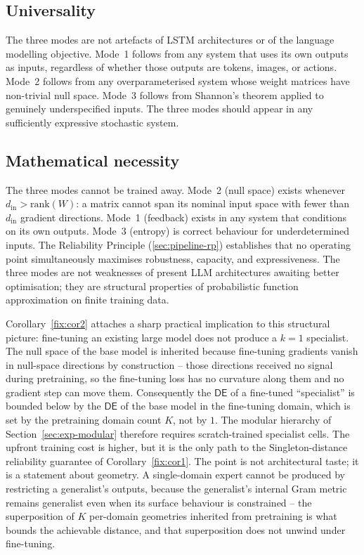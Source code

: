 \documentclass[11pt,a4paper]{article}
\newcommand{\DE}{\mathsf{DE}}
\begin{document}
\subsection{Universality}
\label{sec:disc-univ}

The three modes are not artefacts of LSTM architectures or of the language modelling objective. Mode~1 follows from any system that uses its own outputs as inputs, regardless of whether those outputs are tokens, images, or actions. Mode~2 follows from any overparameterised system whose weight matrices have non-trivial null space. Mode~3 follows from Shannon's theorem applied to genuinely underspecified inputs. The three modes should appear in any sufficiently expressive stochastic system.

\subsection{Mathematical necessity}
\label{sec:disc-necessity}
The three modes cannot be trained away. Mode~2 (null space) exists whenever $d_{\mathrm{in}} > \mathrm{rank}(W)$: a matrix cannot span its nominal input space with fewer than $d_{\mathrm{in}}$ gradient directions. Mode~1 (feedback) exists in any system that conditions on its own outputs. Mode~3 (entropy) is correct behaviour for underdetermined inputs. The Reliability Principle (\ref{sec:pipeline-rp}) establishes that no operating point simultaneously maximises robustness, capacity, and expressiveness. The three modes are not weaknesses of present LLM architectures awaiting better optimisation; they are structural properties of probabilistic function approximation on finite training data.

Corollary~\ref{fix:cor2} attaches a sharp practical implication to this structural picture: fine-tuning an existing large model does not produce a $k = 1$ specialist. The null space of the base model is inherited because fine-tuning gradients vanish in null-space directions by construction -- those directions received no signal during pretraining, so the fine-tuning loss has no curvature along them and no gradient step can move them. Consequently the $\DE$ of a fine-tuned ``specialist'' is bounded below by the $\DE$ of the base model in the fine-tuning domain, which is set by the pretraining domain count $K$, not by $1$. The modular hierarchy of Section~\ref{sec:exp-modular} therefore requires scratch-trained specialist cells. The upfront training cost is higher, but it is the only path to the Singleton-distance reliability guarantee of Corollary~\ref{fix:cor1}. The point is not architectural taste; it is a statement about geometry. A single-domain expert cannot be produced by restricting a generalist's outputs, because the generalist's internal Gram metric remains generalist even when its surface behaviour is constrained -- the superposition of $K$ per-domain geometries inherited from pretraining is what bounds the achievable distance, and that superposition does not unwind under fine-tuning.
\end{document}
